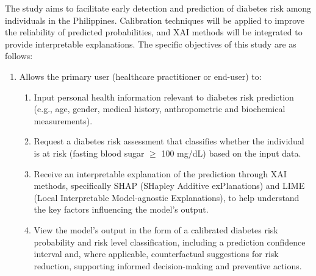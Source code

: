 The study aims to facilitate early detection and prediction of diabetes risk among individuals in the Philippines. Calibration techniques will be applied to improve the reliability of predicted probabilities, and XAI methods will be integrated to provide interpretable explanations. The specific objectives of this study are as follows:

\begin{enumerate}
    \item Allows the primary user (healthcare practitioner or end-user) to:
    \begin{enumerate}
        \item Input personal health information relevant to diabetes risk prediction (e.g., age, gender, medical history, anthropometric and biochemical measurements).
        \item Request a diabetes risk assessment that classifies whether the individual is at risk (fasting blood sugar $\geq$ 100 mg/dL) based on the input data.
        \item Receive an interpretable explanation of the prediction through XAI methods, specifically SHAP (SHapley Additive exPlanations) and LIME (Local Interpretable Model-agnostic Explanations), to help understand the key factors influencing the model's output.
        \item View the model's output in the form of a calibrated diabetes risk probability and risk level classification, including a prediction confidence interval and, where applicable, counterfactual suggestions for risk reduction, supporting informed decision-making and preventive actions.
    \end{enumerate}


\end{enumerate}
